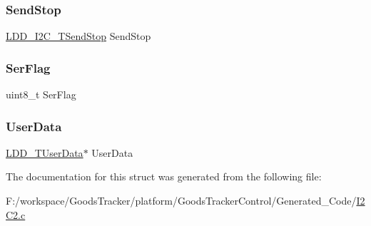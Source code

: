 \subsubsection{\texorpdfstring{Send\+Stop}{SendStop}}
{\footnotesize\ttfamily \hyperlink{group___p_e___types__module_gacac4ade6fbcd28c9ddcd864242063ec8}{L\+D\+D\+\_\+\+I2\+C\+\_\+\+T\+Send\+Stop} Send\+Stop}

\mbox{\label{struct_i2_c2___t_device_data_a3b9f8fe483df17865eec4a4dbae68f94}} 
\subsubsection{\texorpdfstring{Ser\+Flag}{SerFlag}}
{\footnotesize\ttfamily uint8\+\_\+t Ser\+Flag}

\mbox{\label{struct_i2_c2___t_device_data_a849d3e0bc02b5dc79ba5b17a03bd2a28}} 
\subsubsection{\texorpdfstring{User\+Data}{UserData}}
{\footnotesize\ttfamily \hyperlink{group___p_e___types__module_ga0b66a73f87238a782318aa0be7578e35}{L\+D\+D\+\_\+\+T\+User\+Data}$\ast$ User\+Data}



The documentation for this struct was generated from the following file\+:\begin{DoxyCompactItemize}
\item 
F\+:/workspace/\+Goods\+Tracker/platform/\+Goods\+Tracker\+Control/\+Generated\+\_\+\+Code/\hyperlink{_i2_c2_8c}{I2\+C2.\+c}\end{DoxyCompactItemize}

